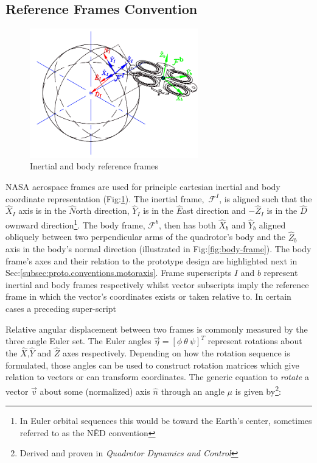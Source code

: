 \subsection{Reference Frames Convention}
\label{subsec:proto.conventions.frames}
\begin{figure}[htbp]
\centering
\includegraphics[width=0.65\textwidth]{figs/reference-frame}
\caption{Inertial and body reference frames}
\label{fig:ref_frame}
\end{figure}
NASA aerospace frames are used for principle cartesian inertial and body coordinate representation (Fig:\ref{fig:ref_frame}). The inertial frame,~$\mathcal{F}^I$, is aligned such that the $\hat{X}_I$ axis is in the $\hat{N}$orth direction, $\hat{Y}_I$ is in the $\hat{E}$ast direction and $-\hat{Z}_I$ is  in the $\hat{D}$ownward direction\footnote{In Euler orbital sequences this would be toward the Earth's center, sometimes referred to as the N\^{E}D convention}. The body frame, $\mathcal{F}^b$, then has both $\hat{X}_b$ and $\hat{Y}_b$ aligned obliquely between two perpendicular arms of the quadrotor's body and the $\hat{Z}_b$ axis in the body's normal direction (illustrated in Fig:\ref{fig:body-frame}). The body frame's axes and their relation to the prototype design are highlighted next in Sec:\ref{subsec:proto.conventions.motoraxis}. Frame superscripts $I$ and $b$ represent inertial and body frames respectively whilst vector subscripts imply the reference frame in which the vector's coordinates exists or taken relative to. In certain cases a preceding super-script 
\par
Relative angular displacement between two frames is commonly measured by the three angle Euler set. The Euler angles $\vec{\eta}=[\phi ~\theta ~\psi]^T$ represent rotations about the $\hat{X}$,$\hat{Y}$ and $\hat{Z}$ axes respectively. Depending on how the rotation sequence is formulated, those angles can be used to construct rotation matrices which give relation to vectors or can transform coordinates. The generic equation to \emph{rotate} a vector $\vec{v}$ about some (normalized) axis $\hat{n}$ through an angle $\mu$ is given by\footnote{Derived and proven in \emph{Quadrotor Dynamics and Control}\cite{quaddynamics}}:
